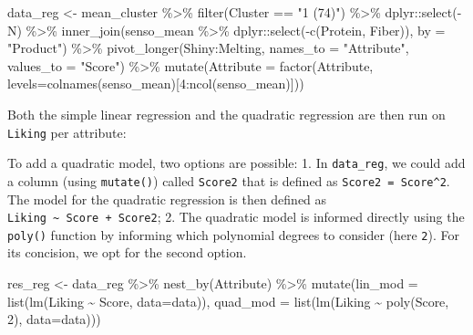 \documentclass[
]{krantz}
\makeatletter
\newenvironment{Shaded}{\begin{snugshade}}{\end{snugshade}}
\newcommand{\AttributeTok}[1]{\textcolor[rgb]{0.61,0.61,0.61}{#1}}
\newcommand{\DecValTok}[1]{\textcolor[rgb]{0.06,0.06,0.06}{#1}}
\newcommand{\FunctionTok}[1]{\textcolor[rgb]{0,0,0}{#1}}
\newcommand{\NormalTok}[1]{#1}
\newcommand{\OtherTok}[1]{\textcolor[rgb]{0.37,0.37,0.37}{#1}}
\newcommand{\SpecialCharTok}[1]{\textcolor[rgb]{0,0,0}{#1}}
\newcommand{\StringTok}[1]{\textcolor[rgb]{0.5,0.5,0.5}{#1}}
\renewenvironment{quote}{\begin{VF}}{\end{VF}}
\newenvironment{kframe}{%
\medskip{}
\setlength{\fboxsep}{.8em}
 \def\at@end@of@kframe{}%
 \ifinner\ifhmode%
  \def\at@end@of@kframe{\end{minipage}}%
  \begin{minipage}{\columnwidth}%
 \fi\fi%
 \def\FrameCommand##1{\hskip\@totalleftmargin \hskip-\fboxsep
 \colorbox{shadecolor}{##1}\hskip-\fboxsep
     \hskip-\linewidth \hskip-\@totalleftmargin \hskip\columnwidth}%
 \MakeFramed {\advance\hsize-\width
   \@totalleftmargin\z@ \linewidth\hsize
   \@setminipage}}%
 {\par\unskip\endMakeFramed%
 \at@end@of@kframe}
\renewenvironment{Shaded}{\begin{kframe}}{\end{kframe}}
\makeatother
\begin{document}
\begin{Shaded}
\begin{Highlighting}[]
\NormalTok{data\_reg }\OtherTok{\textless{}{-}}\NormalTok{ mean\_cluster }\SpecialCharTok{\%\textgreater{}\%}
  \FunctionTok{filter}\NormalTok{(Cluster }\SpecialCharTok{==} \StringTok{"1 (74)"}\NormalTok{) }\SpecialCharTok{\%\textgreater{}\%}
\NormalTok{  dplyr}\SpecialCharTok{::}\FunctionTok{select}\NormalTok{(}\SpecialCharTok{{-}}\NormalTok{N) }\SpecialCharTok{\%\textgreater{}\%}
  \FunctionTok{inner\_join}\NormalTok{(senso\_mean }\SpecialCharTok{\%\textgreater{}\%} 
\NormalTok{               dplyr}\SpecialCharTok{::}\FunctionTok{select}\NormalTok{(}\SpecialCharTok{{-}}\FunctionTok{c}\NormalTok{(Protein, Fiber)), }\AttributeTok{by =} \StringTok{"Product"}\NormalTok{) }\SpecialCharTok{\%\textgreater{}\%}
  \FunctionTok{pivot\_longer}\NormalTok{(Shiny}\SpecialCharTok{:}\NormalTok{Melting, }
               \AttributeTok{names\_to =} \StringTok{"Attribute"}\NormalTok{, }\AttributeTok{values\_to =} \StringTok{"Score"}\NormalTok{) }\SpecialCharTok{\%\textgreater{}\%}
  \FunctionTok{mutate}\NormalTok{(}\AttributeTok{Attribute =} 
           \FunctionTok{factor}\NormalTok{(Attribute, }
                  \AttributeTok{levels=}\FunctionTok{colnames}\NormalTok{(senso\_mean)[}\DecValTok{4}\SpecialCharTok{:}\FunctionTok{ncol}\NormalTok{(senso\_mean)]))}
\end{Highlighting}
\end{Shaded}

Both the simple linear regression and the quadratic regression are then run on \texttt{Liking} per attribute:

\begin{quote}
To add a quadratic model, two options are possible:
1. In \texttt{data\_reg}, we could add a column (using \texttt{mutate()}) called \texttt{Score2} that is defined as \texttt{Score2\ =\ Score\^{}2}. The model for the quadratic regression is then defined as \texttt{Liking\ \textasciitilde{}\ Score\ +\ Score2};
2. The quadratic model is informed directly using the \texttt{poly()} function by informing which polynomial degrees to consider (here \texttt{2}).
For its concision, we opt for the second option.
\end{quote}

\begin{Shaded}
\begin{Highlighting}[]
\NormalTok{res\_reg }\OtherTok{\textless{}{-}}\NormalTok{ data\_reg }\SpecialCharTok{\%\textgreater{}\%}
  \FunctionTok{nest\_by}\NormalTok{(Attribute) }\SpecialCharTok{\%\textgreater{}\%}
  \FunctionTok{mutate}\NormalTok{(}\AttributeTok{lin\_mod =} \FunctionTok{list}\NormalTok{(}\FunctionTok{lm}\NormalTok{(Liking }\SpecialCharTok{\textasciitilde{}}\NormalTok{ Score, }\AttributeTok{data=}\NormalTok{data)),}
         \AttributeTok{quad\_mod =} \FunctionTok{list}\NormalTok{(}\FunctionTok{lm}\NormalTok{(Liking }\SpecialCharTok{\textasciitilde{}} \FunctionTok{poly}\NormalTok{(Score, }\DecValTok{2}\NormalTok{), }\AttributeTok{data=}\NormalTok{data)))}
\end{Highlighting}
\end{Shaded}
\end{document}
